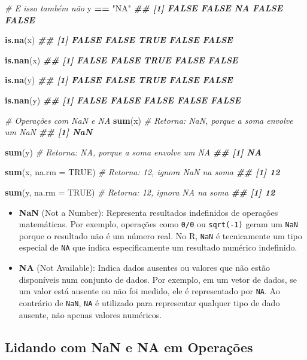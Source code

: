 \documentclass[
]{book}
\newenvironment{Shaded}{\begin{snugshade}}{\end{snugshade}}
\newcommand{\AttributeTok}[1]{\textcolor[rgb]{0.13,0.29,0.53}{#1}}
\newcommand{\CommentTok}[1]{\textcolor[rgb]{0.56,0.35,0.01}{\textit{#1}}}
\newcommand{\ConstantTok}[1]{\textcolor[rgb]{0.56,0.35,0.01}{#1}}
\newcommand{\DocumentationTok}[1]{\textcolor[rgb]{0.56,0.35,0.01}{\textbf{\textit{#1}}}}
\newcommand{\FunctionTok}[1]{\textcolor[rgb]{0.13,0.29,0.53}{\textbf{#1}}}
\newcommand{\NormalTok}[1]{#1}
\newcommand{\SpecialCharTok}[1]{\textcolor[rgb]{0.81,0.36,0.00}{\textbf{#1}}}
\newcommand{\StringTok}[1]{\textcolor[rgb]{0.31,0.60,0.02}{#1}}
\begin{document}
\begin{Shaded}
\begin{Highlighting}[]
\CommentTok{\# E isso também não}
\NormalTok{y }\SpecialCharTok{==} \StringTok{"NA"}
\DocumentationTok{\#\# [1] FALSE FALSE    NA FALSE FALSE}

\FunctionTok{is.na}\NormalTok{(x)}
\DocumentationTok{\#\# [1] FALSE FALSE  TRUE FALSE FALSE}

\FunctionTok{is.nan}\NormalTok{(x) }
\DocumentationTok{\#\# [1] FALSE FALSE  TRUE FALSE FALSE}

\FunctionTok{is.na}\NormalTok{(y)}
\DocumentationTok{\#\# [1] FALSE FALSE  TRUE FALSE FALSE}

\FunctionTok{is.nan}\NormalTok{(y)}
\DocumentationTok{\#\# [1] FALSE FALSE FALSE FALSE FALSE}

\CommentTok{\# Operações com NaN e NA}
\FunctionTok{sum}\NormalTok{(x)  }\CommentTok{\# Retorna: NaN, porque a soma envolve um NaN}
\DocumentationTok{\#\# [1] NaN}

\FunctionTok{sum}\NormalTok{(y)  }\CommentTok{\# Retorna: NA, porque a soma envolve um NA}
\DocumentationTok{\#\# [1] NA}
    
\FunctionTok{sum}\NormalTok{(x, }\AttributeTok{na.rm =} \ConstantTok{TRUE}\NormalTok{)  }\CommentTok{\# Retorna: 12, ignora NaN na soma}
\DocumentationTok{\#\# [1] 12}

\FunctionTok{sum}\NormalTok{(y, }\AttributeTok{na.rm =} \ConstantTok{TRUE}\NormalTok{)  }\CommentTok{\# Retorna: 12, ignora NA na soma}
\DocumentationTok{\#\# [1] 12}
\end{Highlighting}
\end{Shaded}

\begin{itemize}
\item
  \textbf{NaN} (Not a Number): Representa resultados indefinidos de
  operações matemáticas. Por exemplo, operações como \texttt{0/0} ou
  \texttt{sqrt(-1)} geram um \texttt{NaN} porque o resultado não é um número real.
  No R, \texttt{NaN} é tecnicamente um tipo especial de \texttt{NA} que indica
  especificamente um resultado numérico indefinido.
\item
  \textbf{NA} (Not Available): Indica dados ausentes ou valores que não
  estão disponíveis num conjunto de dados. Por exemplo, em um vetor de
  dados, se um valor está ausente ou não foi medido, ele é
  representado por \texttt{NA}. Ao contrário de \texttt{NaN}, \texttt{NA} é utilizado para
  representar qualquer tipo de dado ausente, não apenas valores
  numéricos.
\end{itemize}

\subsection{Lidando com NaN e NA em Operações}\label{lidando-com-nan-e-na-em-operauxe7uxf5es}
\end{document}
